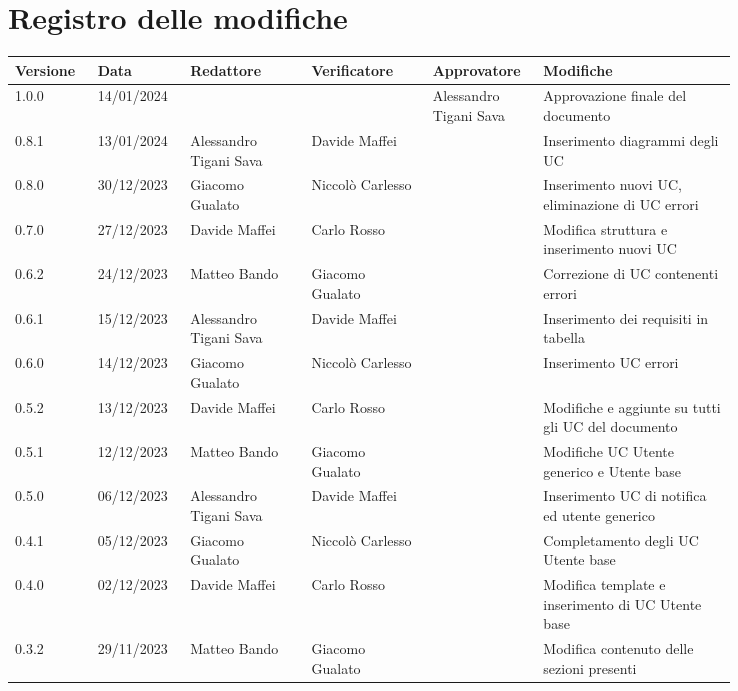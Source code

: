 \section*{Registro delle modifiche}


{
\renewcommand{\arraystretch}{1.5}
\scriptsize
\begin{longtable}{p{0.10\linewidth}p{0.10\linewidth}p{0.15\linewidth}p{0.15\linewidth}p{0.10\linewidth}p{0.24\linewidth}}
	\textbf{Versione} 	& \textbf{Data} & \textbf{Redattore}	& \textbf{Verificatore} & \textbf{Approvatore} 	& \textbf{Modifiche} \\
	\hline
	1.0.0	& 14/01/2024 	&						& 						& Alessandro Tigani Sava & Approvazione finale del documento\\
	\hline
	0.8.1	& 13/01/2024 	& Alessandro Tigani Sava & Davide Maffei 		&	& Inserimento diagrammi degli UC \\
	\hline
	0.8.0	& 30/12/2023 	& Giacomo Gualato 		& Niccolò Carlesso 		&	& Inserimento nuovi UC, eliminazione di UC errori \\
	\hline
	0.7.0	& 27/12/2023 	& Davide Maffei 		& Carlo Rosso 			&	& Modifica struttura e inserimento nuovi UC \\
	\hline
	0.6.2	& 24/12/2023 	& Matteo Bando 			& Giacomo Gualato 		&	& Correzione di UC contenenti errori 	\\
	\hline
	0.6.1	& 15/12/2023 	& Alessandro Tigani Sava & Davide Maffei 		&	& Inserimento dei requisiti in tabella 	\\
	\hline
	0.6.0	& 14/12/2023 	& Giacomo Gualato 		& Niccolò Carlesso 		&	& Inserimento UC errori 				\\
	\hline
	0.5.2	& 13/12/2023	& Davide Maffei 		& Carlo Rosso 			&	& Modifiche e aggiunte su tutti gli UC del documento \\
	\hline
	0.5.1	& 12/12/2023 	& Matteo Bando 			& Giacomo Gualato 		&	& Modifiche UC Utente generico e Utente base 	\\
	\hline
	0.5.0	& 06/12/2023	& Alessandro Tigani Sava & Davide Maffei		&	& Inserimento UC di notifica ed utente generico	\\
	\hline
	0.4.1	& 05/12/2023	& Giacomo Gualato		& Niccolò Carlesso		&	& Completamento degli UC Utente base			\\
	\hline
	0.4.0	& 02/12/2023	& Davide Maffei			& Carlo Rosso			&   & Modifica template e inserimento di UC Utente base	\\
	\hline
	0.3.2	& 29/11/2023	& Matteo Bando			& Giacomo Gualato		& 	& Modifica contenuto delle sezioni presenti \\

\end{longtable}}
